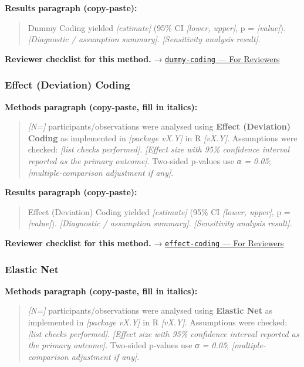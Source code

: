 \documentclass[
]{article}
\begin{document}
\textbf{Results paragraph (copy-paste):}

\begin{quote}
Dummy Coding yielded \emph{{[}estimate{]}} (95\% CI \emph{{[}lower,
upper{]}}, p = \emph{{[}value{]}}). \emph{{[}Diagnostic / assumption
summary{]}}. \emph{{[}Sensitivity analysis result{]}}.
\end{quote}

\textbf{Reviewer checklist for this method.} →
\href{../chapters/07-regression/dummy-coding.Rmd\#for-reviewers}{\texttt{dummy-coding}
--- For Reviewers}

\subsubsection{Effect (Deviation) Coding}\label{effect-deviation-coding}

\textbf{Methods paragraph (copy-paste, fill in italics):}

\begin{quote}
\emph{{[}N={]}} participants/observations were analysed using
\textbf{Effect (Deviation) Coding} as implemented in \emph{{[}package
vX.Y{]}} in R \emph{{[}vX.Y{]}}. Assumptions were checked: \emph{{[}list
checks performed{]}}. \emph{{[}Effect size with 95\% confidence interval
reported as the primary outcome{]}}. Two-sided p-values use \emph{α =
0.05}; \emph{{[}multiple-comparison adjustment if any{]}}.
\end{quote}

\textbf{Results paragraph (copy-paste):}

\begin{quote}
Effect (Deviation) Coding yielded \emph{{[}estimate{]}} (95\% CI
\emph{{[}lower, upper{]}}, p = \emph{{[}value{]}}). \emph{{[}Diagnostic
/ assumption summary{]}}. \emph{{[}Sensitivity analysis result{]}}.
\end{quote}

\textbf{Reviewer checklist for this method.} →
\href{../chapters/07-regression/effect-coding.Rmd\#for-reviewers}{\texttt{effect-coding}
--- For Reviewers}

\subsubsection{Elastic Net}\label{elastic-net}

\textbf{Methods paragraph (copy-paste, fill in italics):}

\begin{quote}
\emph{{[}N={]}} participants/observations were analysed using
\textbf{Elastic Net} as implemented in \emph{{[}package vX.Y{]}} in R
\emph{{[}vX.Y{]}}. Assumptions were checked: \emph{{[}list checks
performed{]}}. \emph{{[}Effect size with 95\% confidence interval
reported as the primary outcome{]}}. Two-sided p-values use \emph{α =
0.05}; \emph{{[}multiple-comparison adjustment if any{]}}.
\end{quote}
\end{document}
